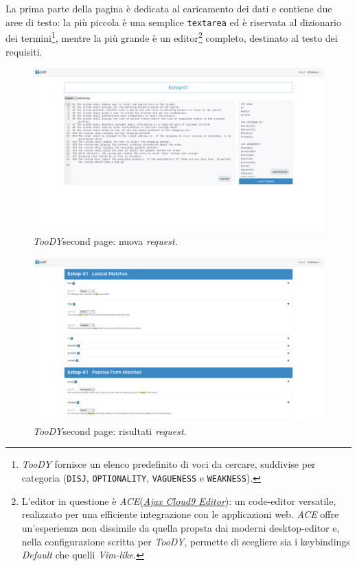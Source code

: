 \documentclass[12pt]{report}
\newcommand{\toody}{\textsl{TooDY}\xspace}
\newcommand{\ace}{\textsl{ACE}\xspace}
\begin{document}
La prima parte della pagina è dedicata al caricamento dei dati e contiene due aree di testo: la più piccola è una semplice \texttt{textarea} ed è riservata al dizionario dei termini\footnote{\toody fornisce un elenco predefinito di voci da cercare, suddivise per categoria (\texttt{DISJ}, \texttt{OPTIONALITY}, \texttt{VAGUENESS} e \texttt{WEAKNESS}).}, mentre la più grande è un editor\footnote{L'editor in questione è \ace (\href{https://ace.c9.io/}{\textit{Ajax Cloud9 Editor}}): un code-editor versatile, realizzato per una efficiente integrazione con le applicazioni web. \ace offre un'esperienza non dissimile da quella propsta dai moderni desktop-editor e, nella configurazione scritta per \toody, permette di scegliere sia i keybindings \textsl{Default} che quelli \textsl{Vim-like}.} completo, destinato al testo dei requisiti.

\begin{figure}[H]
\centering
\includegraphics[width=1.0\textwidth]{pagina2-vuota.png}
\caption{\toody \textsf{second page}: nuova \textit{request}.}
\label{fig:pagina1-login}
\end{figure}

\begin{figure}[H]
\centering
\includegraphics[width=1.0\textwidth]{pagina2-piena.png}
\caption{\toody \textsf{second page}: risultati \textit{request}.}
\label{fig:pagina1-login}
\end{figure}
\end{document}
